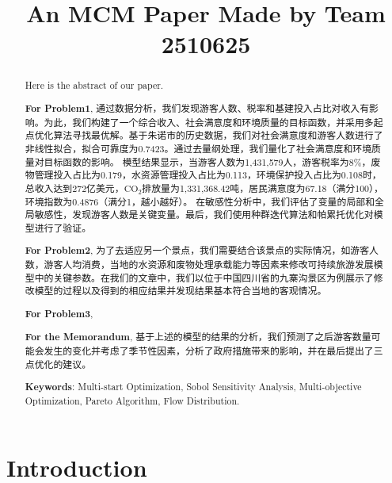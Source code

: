 \documentclass[12pt]{article}  %
\title{An MCM Paper Made by Team 2510625}  %
\begin{document}
\begin{abstract}
    Here is the abstract of our paper.

    \textbf{For Problem1}, 通过数据分析，我们发现游客人数、税率和基建投入占比对收入有影响。为此，我们构建了一个综合收入、社会满意度和环境质量的目标函数，并采用多起点优化算法寻找最优解。基于朱诺市的历史数据，我们对社会满意度和游客人数进行了非线性拟合，拟合可靠度为0.7423。通过去量纲处理，我们量化了社会满意度和环境质量对目标函数的影响。
	模型结果显示，当游客人数为1,431,579人，游客税率为8\%，废物管理投入占比为0.179，水资源管理投入占比为0.113，环境保护投入占比为0.108时，总收入达到272亿美元，$\text{CO}_2$排放量为1,331,368.42吨，居民满意度为67.18（满分100），环境指数为0.4876（满分1，越小越好）。
	在敏感性分析中，我们评估了变量的局部和全局敏感性，发现游客人数是关键变量。最后，我们使用种群迭代算法和帕累托优化对模型进行了验证。

    \textbf{For Problem2}, 为了去适应另一个景点，我们需要结合该景点的实际情况，如游客人数，游客人均消费，当地的水资源和废物处理承载能力等因素来修改可持续旅游发展模型中的关键参数。在我们的文章中，我们以位于中国四川省的九寨沟景区为例展示了修改模型的过程以及得到的相应结果并发现结果基本符合当地的客观情况。

    \textbf{For Problem3}, 

	\textbf{For the Memorandum}, 基于上述的模型的结果的分析，我们预测了之后游客数量可能会发生的变化并考虑了季节性因素，分析了政府措施带来的影响，并在最后提出了三点优化的建议。
    
    \vspace{5pt}
    \textbf{Keywords}: Multi-start Optimization, Sobol Sensitivity Analysis, Multi-objective Optimization, Pareto Algorithm, Flow Distribution.

\end{abstract}

\maketitle  %
\tableofcontents  %


\section{Introduction}
\end{document}
